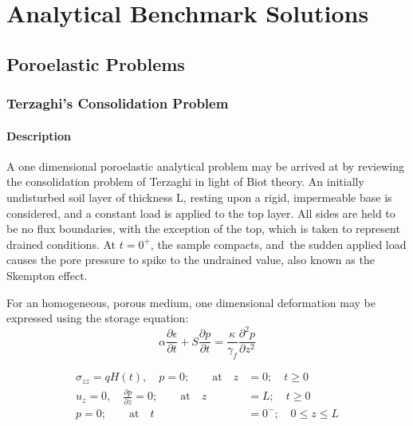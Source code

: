 
\chapter{\label{cha:Analytical-Solns}Analytical Benchmark Solutions}


\section{\label{sec:PoroelasticProblems}Poroelastic Problems}
\subsection{\label{sub:Terzaghi-Consolidation}Terzaghi's Consolidation Problem}

\subsubsection{Description}

A one dimensional poroelastic analytical problem may be arrived at
by reviewing the consolidation problem of Terzaghi\cite{Terzaghi:1923} in light
of Biot theory. An initially undisturbed soil layer of thickness L, resting upon
a rigid, impermeable base is considered, and a constant load is applied to the top
layer. All sides are held to be no flux boundaries, with the exception of the top,
which is taken to represent drained conditions. At $t = 0^{+}$, the sample compacts,
and\ the sudden applied load causes the pore pressure to spike to the undrained 
value, also known as the Skempton effect.\par

\smallskip


For an homogeneous, porous medium, one dimensional deformation may be expressed
using the storage equation\cite{Verruijt:2013}:
\begin{equation}
 \alpha \frac{\partial \epsilon}{\partial t} + S \frac{\partial p}{\partial t} = \frac{\kappa}{\gamma_{f}} \frac{\partial^{2} p}{\partial z^{2}}
\end{equation}


\begin{align}
 \sigma_{zz} = q H(t), \quad p = 0; \qquad \text{at} \quad z &=0; \quad t \geq 0 \\
 u_{z} = 0, \quad \frac{\partial p}{\partial z} = 0; \qquad \text{at} \quad z &= L; \quad t \geq 0 \\
 p=0; \qquad \text{at} \quad t &= 0^{-}; \quad 0 \leq z \leq L
\end{align}

